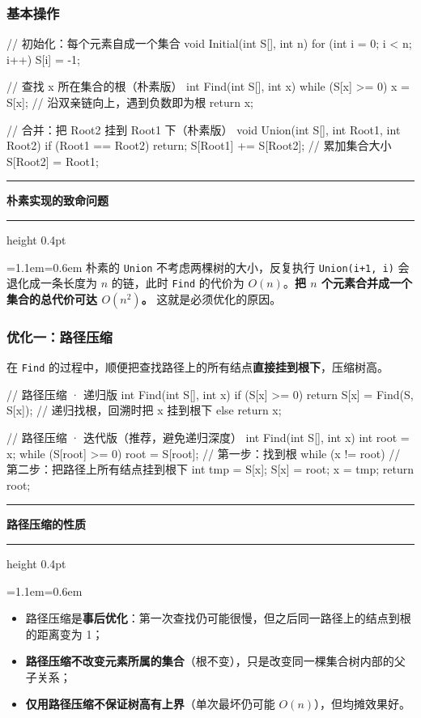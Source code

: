 \documentclass[11pt,openany,UTF8]{ctexbook}
\newcommand{\callouthead}[2]{%
  \par\addvspace{7pt}\noindent
  {\color{#1}\rule[-0.15em]{3pt}{1.05em}}\hspace{0.5em}%
  {\bfseries\color{#1}#2}\par\nobreak\vspace{-0.35em}%
  {\color{rulesep}\hrule height 0.4pt}\nobreak\vspace{0.45em}%
  \begingroup\small\setlength{\parindent}{0pt}%
  \leftskip=1.1em\rightskip=0.6em\noindent\ignorespaces}
\newcommand{\calloutend}{\par\endgroup\addvspace{7pt}}
\newenvironment{callkey}[1]{\callouthead{keybar}{#1}}{\calloutend}
\newenvironment{callwarn}[1]{\callouthead{warnbar}{#1}}{\calloutend}
\begin{document}
\subsubsection{基本操作}

\begin{codebox}
// 初始化：每个元素自成一个集合
void Initial(int S[], int n) {
    for (int i = 0; i < n; i++) S[i] = -1;
}

// 查找 x 所在集合的根（朴素版）
int Find(int S[], int x) {
    while (S[x] >= 0) x = S[x];   // 沿双亲链向上，遇到负数即为根
    return x;
}

// 合并：把 Root2 挂到 Root1 下（朴素版）
void Union(int S[], int Root1, int Root2) {
    if (Root1 == Root2) return;
    S[Root1] += S[Root2];         // 累加集合大小
    S[Root2] = Root1;
}
\end{codebox}

\begin{callwarn}{朴素实现的致命问题}
朴素的 \texttt{Union} 不考虑两棵树的大小，反复执行 \texttt{Union(i+\allowbreak{}1,\allowbreak{} i)\allowbreak{}} 会退化成一条长度为 $n$ 的链，此时 \texttt{Find} 的代价为 $O(n)$。\textbf{把 $n$ 个元素合并成一个集合的总代价可达 $O(n^2)$。} 这就是必须优化的原因。

\end{callwarn}

\subsubsection{优化一：路径压缩}

在 \texttt{Find} 的过程中，顺便把查找路径上的所有结点\textbf{直接挂到根下}，压缩树高。

\begin{codebox}
// 路径压缩 · 递归版
int Find(int S[], int x) {
    if (S[x] >= 0)
        return S[x] = Find(S, S[x]);   // 递归找根，回溯时把 x 挂到根下
    else
        return x;
}

// 路径压缩 · 迭代版（推荐，避免递归深度）
int Find(int S[], int x) {
    int root = x;
    while (S[root] >= 0) root = S[root];   // 第一步：找到根
    while (x != root) {                    // 第二步：把路径上所有结点挂到根下
        int tmp = S[x];
        S[x] = root;
        x = tmp;
    }
    return root;
}
\end{codebox}

\begin{callkey}{路径压缩的性质}
\begin{itemize}
\item 路径压缩是\textbf{事后优化}：第一次查找仍可能很慢，但之后同一路径上的结点到根的距离变为 1；
\item \textbf{路径压缩不改变元素所属的集合}（根不变），只是改变同一棵集合树内部的父子关系；
\item \textbf{仅用路径压缩不保证树高有上界}（单次最坏仍可能 $O(n)$），但均摊效果好。
\end{itemize}
\end{callkey}
\end{document}
